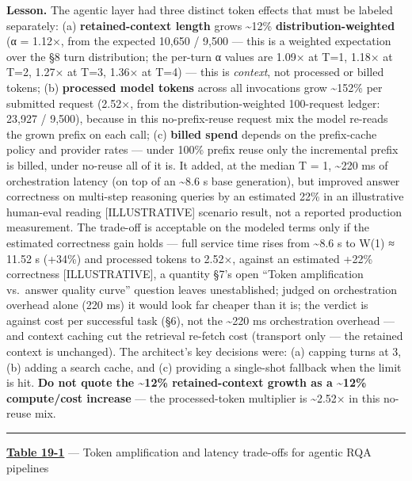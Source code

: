 \textbf{Lesson.} The agentic layer had three distinct token effects that
must be labeled separately: (a) \textbf{retained-context length} grows
\textasciitilde12\% \textbf{distribution-weighted} (α = 1.12×, from the
expected 10,650 / 9,500 --- this is a weighted expectation over the §8
turn distribution; the per-turn α values are 1.09× at T=1, 1.18× at T=2,
1.27× at T=3, 1.36× at T=4) --- this is \emph{context}, not processed or
billed tokens; (b) \textbf{processed model tokens} across all
invocations grow \textasciitilde152\% per submitted request (2.52×, from
the distribution-weighted 100-request ledger: 23,927 / 9,500), because
in this no-prefix-reuse request mix the model re-reads the grown prefix
on each call; (c) \textbf{billed spend} depends on the prefix-cache
policy and provider rates --- under 100\% prefix reuse only the
incremental prefix is billed, under no-reuse all of it is. It added, at
the median T = 1, \textasciitilde220 ms of orchestration latency (on top
of an \textasciitilde8.6 s base generation), but improved answer
correctness on multi-step reasoning queries by an estimated 22\% in an
illustrative human-eval reading \mbox{{[}ILLUSTRATIVE{]}} scenario result, not
a reported production measurement. The trade-off is acceptable on the
modeled terms only if the estimated correctness gain holds --- full
service time rises from \textasciitilde8.6 s to W(1) ≈ 11.52 s (+34\%)
and processed tokens to 2.52×, against an estimated +22\% correctness
\mbox{{[}ILLUSTRATIVE{]}}, a quantity §7's open ``Token amplification
vs.~answer quality curve'' question leaves unestablished; judged on
orchestration overhead alone (220 ms) it would look far cheaper than it
is; the verdict is against cost per successful task (§6), not the
\textasciitilde220 ms orchestration overhead --- and context caching cut
the retrieval re-fetch cost (transport only --- the retained context is
unchanged). The architect's key decisions were: (a) capping turns at 3,
(b) adding a search cache, and (c) providing a single-shot fallback when
the limit is hit. \textbf{Do not quote the \textasciitilde12\%
retained-context growth as a \textasciitilde12\% compute/cost increase}
--- the processed-token multiplier is \textasciitilde2.52× in this
no-reuse mix.


\begin{center}\rule{0.5\linewidth}{0.5pt}\end{center}

\textbf{\hyperref[tab:19.1]{Table 19-1}} --- Token amplification and latency trade-offs for
agentic RQA pipelines

